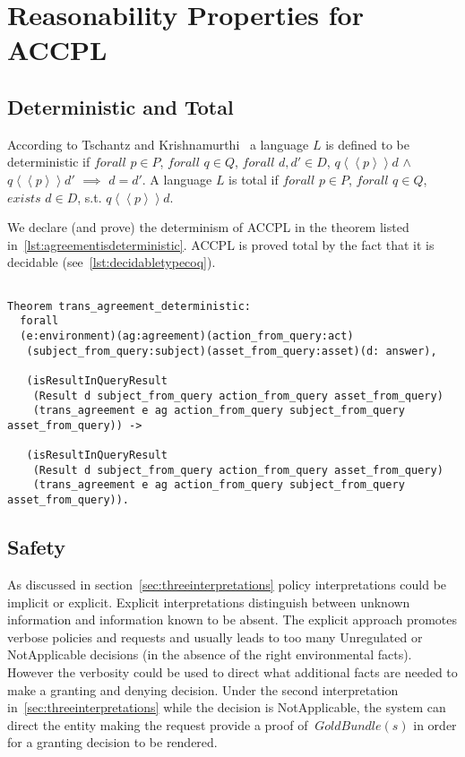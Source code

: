 \section{Reasonability Properties for ACCPL}

\subsection{Deterministic and Total}

According to Tschantz and Krishnamurthi~\cite{Tschantz} a language $L$ is defined to be deterministic if $forall$ $p \in P$, $forall$ $q \in Q$, $forall$ $d, d' \in D$, $q \left\langle\left\langle p  \right\rangle\right\rangle d$ $\land$ $q \left\langle\left\langle p  \right\rangle\right\rangle d'$ $\implies$ $d = d'$. A language $L$ is total if $forall$ $p \in P$, $forall$ $q \in Q$, $exists$ $d \in D$, s.t. $q \left\langle\left\langle p  \right\rangle\right\rangle d$. 

We declare (and prove) the determinism of \ac{ACCPL} in the theorem listed in~\ref{lst:agreementisdeterministic}. \ac{ACCPL} is proved total by the fact that it is decidable (see~\ref{lst:decidabletypecoq}). 

\begin{lstlisting}

Theorem trans_agreement_deterministic:
  forall
  (e:environment)(ag:agreement)(action_from_query:act)
   (subject_from_query:subject)(asset_from_query:asset)(d: answer),

   (isResultInQueryResult 
    (Result d subject_from_query action_from_query asset_from_query)
    (trans_agreement e ag action_from_query subject_from_query asset_from_query)) ->

   (isResultInQueryResult 
    (Result d subject_from_query action_from_query asset_from_query)
    (trans_agreement e ag action_from_query subject_from_query asset_from_query)).
\end{lstlisting}


\subsection{Safety}

As discussed in section~\ref{sec:threeinterpretations} policy interpretations could be implicit or explicit. Explicit interpretations distinguish between unknown information and information known to be absent. The explicit approach promotes verbose policies and requests and usually leads to too many Unregulated or NotApplicable decisions (in the absence of the right environmental facts). However the verbosity could be used to direct what additional facts are needed to make a granting and denying decision. Under the second interpretation in~\ref{sec:threeinterpretations} while the decision is NotApplicable, the system can direct the entity making the request provide a proof of $~GoldBundle(s)$ in order for a granting decision to be rendered. 

